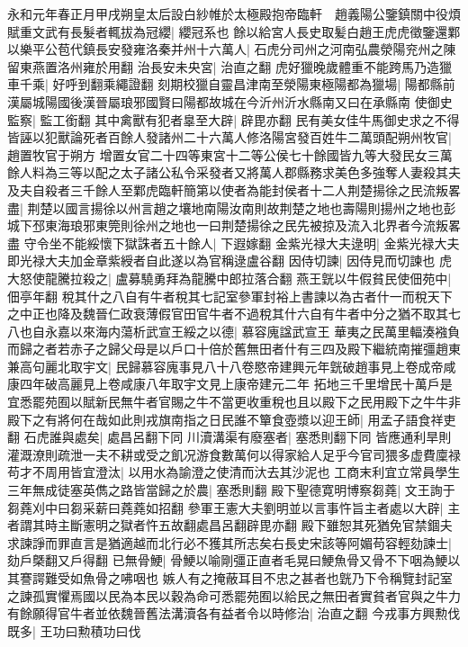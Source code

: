 永和元年春正月甲戌朔皇太后設白紗帷於太極殿抱帝臨軒　趙義陽公鑒鎮關中役煩賦重文武有長髮者輒拔為冠纓|{
	纓冠系也}
餘以給宮人長史取髪白趙王虎虎徵鑒還鄴以樂平公苞代鎮長安發雍洛秦并州十六萬人|{
	石虎分司州之河南弘農滎陽兖州之陳留東燕置洛州雍於用翻}
治長安未央宮|{
	治直之翻}
虎好獵晚歲體重不能跨馬乃造獵車千乘|{
	好呼到翻乘繩證翻}
刻期校獵自靈昌津南至滎陽東極陽都為獵場|{
	陽都縣前漢屬城陽國後漢晉屬琅邪國賢曰陽都故城在今沂州沂水縣南又曰在承縣南}
使御史監察|{
	監工銜翻}
其中禽獸有犯者辠至大辟|{
	辟毘亦翻}
民有美女佳牛馬御史求之不得皆誣以犯獸論死者百餘人發諸州二十六萬人修洛陽宮發百姓牛二萬頭配朔州牧官|{
	趙置牧官于朔方}
增置女官二十四等東宮十二等公侯七十餘國皆九等大發民女三萬餘人料為三等以配之太子諸公私令采發者又將萬人郡縣務求美色多強奪人妻殺其夫及夫自殺者三千餘人至鄴虎臨軒簡第以使者為能封侯者十二人荆楚揚徐之民流叛畧盡|{
	荆楚以國言揚徐以州言趙之壤地南陽汝南則故荆楚之地也壽陽則揚州之地也彭城下邳東海琅邪東筦則徐州之地也一曰荆楚揚徐之民先被掠及流入北界者今流叛畧盡}
守令坐不能綏懷下獄誅者五十餘人|{
	下遐嫁翻}
金紫光禄大夫逯明|{
	金紫光禄大夫即光禄大夫加金章紫綬者自此遂以為官稱逯盧谷翻}
因侍切諫|{
	因侍見而切諫也}
虎大怒使龍騰拉殺之|{
	盧募驍勇拜為龍騰中郎拉落合翻}
燕王皝以牛假貧民使佃苑中|{
	佃亭年翻}
稅其什之八自有牛者稅其七記室參軍封裕上書諫以為古者什一而稅天下之中正也降及魏晉仁政衰薄假官田官牛者不過稅其什六自有牛者中分之猶不取其七八也自永嘉以來海内蕩析武宣王綏之以德|{
	慕容廆諡武宣王}
華夷之民萬里輻湊襁負而歸之者若赤子之歸父母是以戶口十倍於舊無田者什有三四及殿下繼統南摧彊趙東兼高句麗北取宇文|{
	民歸慕容廆事見八十八卷愍帝建興元年皝破趙事見上卷成帝咸康四年破高麗見上卷咸康八年取宇文見上康帝建元二年}
拓地三千里增民十萬戶是宜悉罷苑囿以賦新民無牛者官賜之牛不當更收重稅也且以殿下之民用殿下之牛牛非殿下之有將何在哉如此則戎旗南指之日民誰不簞食壺漿以迎王師|{
	用孟子語食祥吏翻}
石虎誰與處矣|{
	處昌呂翻下同}
川瀆溝渠有廢塞者|{
	塞悉則翻下同}
皆應通利旱則灌溉潦則疏泄一夫不耕或受之飢况游食數萬何以得家給人足乎今官司猥多虚費廩禄苟才不周用皆宜澄汰|{
	以用水為諭澄之使清而汏去其沙泥也}
工商末利宜立常員學生三年無成徒塞英儁之路皆當歸之於農|{
	塞悉則翻}
殿下聖德寛明博察芻蕘|{
	文王詢于芻蕘刈中曰芻采薪曰蕘蕘如招翻}
參軍王憲大夫劉明並以言事忤旨主者處以大辟|{
	主者謂其時主斷憲明之獄者忤五故翻處昌呂翻辟毘亦翻}
殿下雖恕其死猶免官禁錮夫求諫諍而罪直言是猶適越而北行必不獲其所志矣右長史宋該等阿媚苟容輕劾諫士|{
	劾戶槩翻又戶得翻}
已無骨鯁|{
	骨鯁以喻剛彊正直者毛晃曰鯁魚骨又骨不下咽為鯁以其謇諤難受如魚骨之咈咽也}
嫉人有之掩蔽耳目不忠之甚者也皝乃下令稱覽封記室之諫孤實懼焉國以民為本民以穀為命可悉罷苑囿以給民之無田者實貧者官與之牛力有餘願得官牛者並依魏晉舊法溝瀆各有益者令以時修治|{
	治直之翻}
今戎事方興勲伐既多|{
	王功曰勲積功曰伐}
